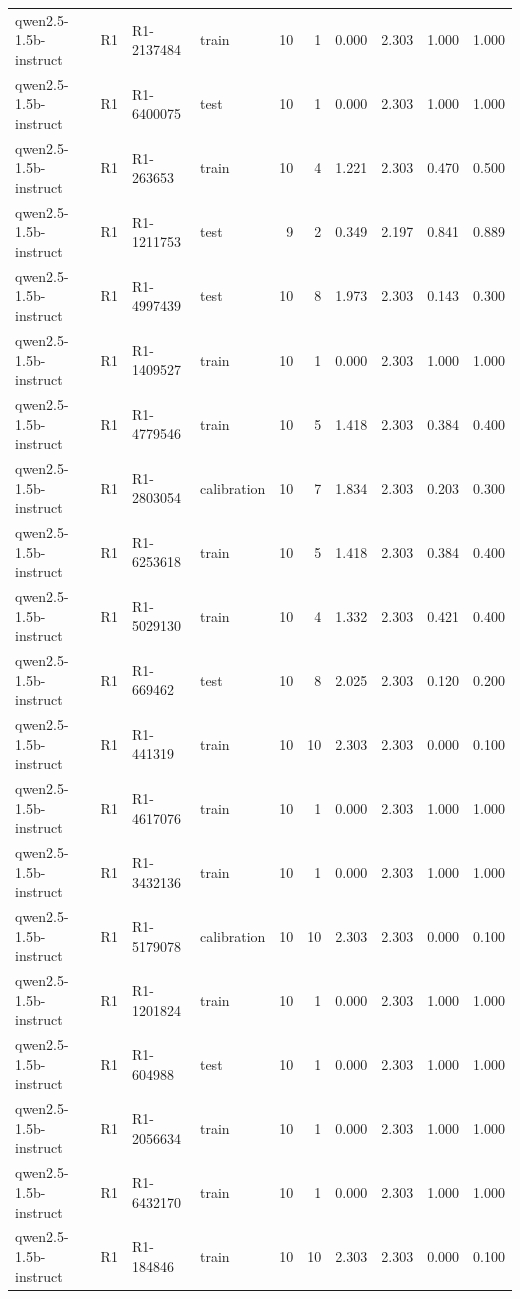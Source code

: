 \begin{table}
\begin{tabular}{llllrrrrrr}
qwen2.5-1.5b-instruct & R1 & R1-2137484 & train & 10 & 1 & 0.000 & 2.303 & 1.000 & 1.000 \\
qwen2.5-1.5b-instruct & R1 & R1-6400075 & test & 10 & 1 & 0.000 & 2.303 & 1.000 & 1.000 \\
qwen2.5-1.5b-instruct & R1 & R1-263653 & train & 10 & 4 & 1.221 & 2.303 & 0.470 & 0.500 \\
qwen2.5-1.5b-instruct & R1 & R1-1211753 & test & 9 & 2 & 0.349 & 2.197 & 0.841 & 0.889 \\
qwen2.5-1.5b-instruct & R1 & R1-4997439 & test & 10 & 8 & 1.973 & 2.303 & 0.143 & 0.300 \\
qwen2.5-1.5b-instruct & R1 & R1-1409527 & train & 10 & 1 & 0.000 & 2.303 & 1.000 & 1.000 \\
qwen2.5-1.5b-instruct & R1 & R1-4779546 & train & 10 & 5 & 1.418 & 2.303 & 0.384 & 0.400 \\
qwen2.5-1.5b-instruct & R1 & R1-2803054 & calibration & 10 & 7 & 1.834 & 2.303 & 0.203 & 0.300 \\
qwen2.5-1.5b-instruct & R1 & R1-6253618 & train & 10 & 5 & 1.418 & 2.303 & 0.384 & 0.400 \\
qwen2.5-1.5b-instruct & R1 & R1-5029130 & train & 10 & 4 & 1.332 & 2.303 & 0.421 & 0.400 \\
qwen2.5-1.5b-instruct & R1 & R1-669462 & test & 10 & 8 & 2.025 & 2.303 & 0.120 & 0.200 \\
qwen2.5-1.5b-instruct & R1 & R1-441319 & train & 10 & 10 & 2.303 & 2.303 & 0.000 & 0.100 \\
qwen2.5-1.5b-instruct & R1 & R1-4617076 & train & 10 & 1 & 0.000 & 2.303 & 1.000 & 1.000 \\
qwen2.5-1.5b-instruct & R1 & R1-3432136 & train & 10 & 1 & 0.000 & 2.303 & 1.000 & 1.000 \\
qwen2.5-1.5b-instruct & R1 & R1-5179078 & calibration & 10 & 10 & 2.303 & 2.303 & 0.000 & 0.100 \\
qwen2.5-1.5b-instruct & R1 & R1-1201824 & train & 10 & 1 & 0.000 & 2.303 & 1.000 & 1.000 \\
qwen2.5-1.5b-instruct & R1 & R1-604988 & test & 10 & 1 & 0.000 & 2.303 & 1.000 & 1.000 \\
qwen2.5-1.5b-instruct & R1 & R1-2056634 & train & 10 & 1 & 0.000 & 2.303 & 1.000 & 1.000 \\
qwen2.5-1.5b-instruct & R1 & R1-6432170 & train & 10 & 1 & 0.000 & 2.303 & 1.000 & 1.000 \\
qwen2.5-1.5b-instruct & R1 & R1-184846 & train & 10 & 10 & 2.303 & 2.303 & 0.000 & 0.100 \\

\end{tabular}
\end{table}
